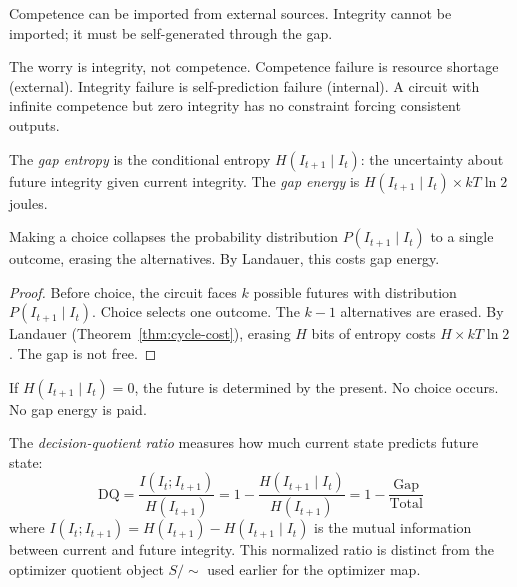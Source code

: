\begin{corollary}\label{cor:import-asymmetry}
Competence can be imported from external sources. Integrity cannot be imported; it must be self-generated through the gap.
\end{corollary}

\begin{remark}
The worry is integrity, not competence. Competence failure is resource shortage (external). Integrity failure is self-prediction failure (internal). A circuit with infinite competence but zero integrity has no constraint forcing consistent outputs.
\end{remark}

\begin{definition}\label{def:gap-energy}
The \emph{gap entropy} is the conditional entropy $H(I_{t+1} \mid I_t)$: the uncertainty about future integrity given current integrity. The \emph{gap energy} is $H(I_{t+1} \mid I_t) \times kT\ln 2$ joules.
\end{definition}

\begin{theorem}\label{thm:choice-pays}
Making a choice collapses the probability distribution $P(I_{t+1} \mid I_t)$ to a single outcome, erasing the alternatives. By Landauer, this costs gap energy.
\end{theorem}

\begin{proof}
Before choice, the circuit faces $k$ possible futures with distribution $P(I_{t+1} \mid I_t)$. Choice selects one outcome. The $k-1$ alternatives are erased. By Landauer (Theorem~\ref{thm:cycle-cost}), erasing $H$ bits of entropy costs $H \times kT\ln 2$. The gap is not free.
\end{proof}

\begin{corollary}\label{cor:zero-gap}
If $H(I_{t+1} \mid I_t) = 0$, the future is determined by the present. No choice occurs. No gap energy is paid.
\end{corollary}

\begin{definition}\label{def:dq-from-gap}
The \emph{decision-quotient ratio} measures how much current state predicts future state:
\[
  \mathrm{DQ} = \frac{I(I_t; I_{t+1})}{H(I_{t+1})} = 1 - \frac{H(I_{t+1} \mid I_t)}{H(I_{t+1})} = 1 - \frac{\text{Gap}}{\text{Total}}
\]
where $I(I_t; I_{t+1}) = H(I_{t+1}) - H(I_{t+1} \mid I_t)$ is the mutual information between current and future integrity.
This normalized ratio is distinct from the optimizer quotient object $S/{\sim}$ used earlier for the optimizer map.
\end{definition}

